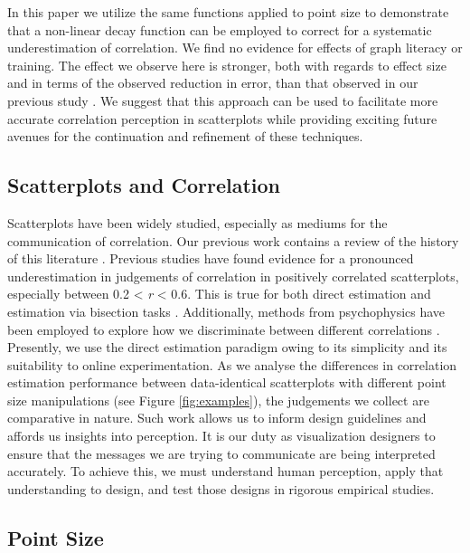 \documentclass{vgtc}                          %
\begin{document}
In this paper we utilize the same functions applied to point size to demonstrate that
a non-linear decay function can be employed to correct for a systematic underestimation of correlation.
We find no evidence for effects of graph literacy or training.
The effect we observe here is stronger, both with regards to effect size
and in terms of the observed reduction in error, than that
observed in our previous study \cite{strain_2023}. We suggest that this
approach can be used to facilitate more accurate correlation
perception in scatterplots while providing exciting future avenues for the continuation
and refinement of these techniques.

\hypertarget{scatterplots-and-correlation}{%
\subsection{Scatterplots and Correlation}\label{scatterplots-and-correlation}}

Scatterplots have been widely studied, especially as mediums for the communication
of correlation. Our previous work contains a review of the history of
this literature \cite{strain_2023}. Previous studies have found evidence for a
pronounced underestimation in judgements of correlation in positively correlated
scatterplots, especially between 0.2 \textless{} \emph{r} \textless{} 0.6. This
is true for both direct estimation \cite{meyer_1992, collyer_1990} and estimation
via bisection tasks \cite{rensink_2017}. Additionally, methods from psychophysics
have been employed to explore how we discriminate between different correlations
\cite{rensink_2014, rensink_2017}. Presently, we use the direct estimation paradigm
owing to its simplicity and its suitability to online experimentation.
As we analyse the differences in correlation estimation performance
between data-identical scatterplots with different point size manipulations (see Figure \ref{fig:examples}),
the judgements we collect are comparative in nature.
Such work allows us to inform design guidelines and affords us insights into perception.
It is our duty as visualization designers to ensure that the
messages we are trying to communicate are being interpreted accurately.
To achieve this, we must understand human perception, apply that understanding
to design, and test those designs in rigorous empirical studies.

\hypertarget{point-size}{%
\subsection{Point Size}\label{point-size}}
\end{document}
